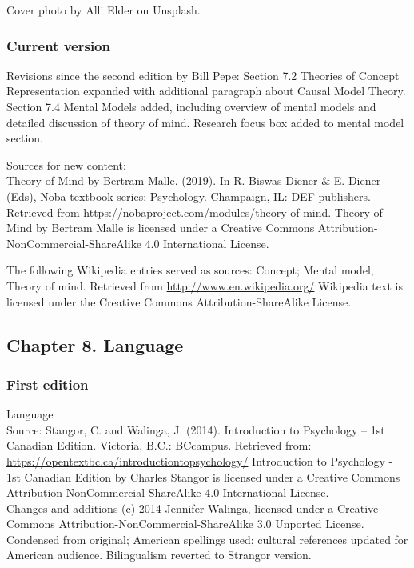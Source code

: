 \documentclass[
]{krantz}
\begin{document}
Cover photo by Alli Elder on Unsplash.

\subsubsection*{Current version}\label{current-version-2}


Revisions since the second edition by Bill Pepe: Section 7.2 Theories of Concept Representation expanded with additional paragraph about Causal Model Theory. Section 7.4 Mental Models added, including overview of mental models and detailed discussion of theory of mind. Research focus box added to mental model section.

Sources for new content:\\
Theory of Mind by Bertram Malle. (2019). In R. Biswas-Diener \& E. Diener (Eds), Noba textbook series: Psychology. Champaign, IL: DEF publishers. Retrieved from \url{https://nobaproject.com/modules/theory-of-mind}.
Theory of Mind by Bertram Malle is licensed under a Creative Commons Attribution-NonCommercial-ShareAlike 4.0 International License.

The following Wikipedia entries served as sources: Concept; Mental model; Theory of mind. Retrieved from \url{http://www.en.wikipedia.org/}
Wikipedia text is licensed under the Creative Commons Attribution-ShareAlike License.

\subsection*{Chapter 8. Language}\label{chapter-8.-language}


\subsubsection*{First edition}\label{first-edition-8}


Language\\
Source: Stangor, C. and Walinga, J. (2014). Introduction to Psychology -- 1st Canadian Edition. Victoria, B.C.: BCcampus. Retrieved from: \url{https://opentextbc.ca/introductiontopsychology/}
Introduction to Psychology - 1st Canadian Edition by Charles Stangor is licensed under a Creative Commons Attribution-NonCommercial-ShareAlike 4.0 International License.\\
Changes and additions (c) 2014 Jennifer Walinga, licensed under a Creative Commons Attribution-NonCommercial-ShareAlike 3.0 Unported License.\\
Condensed from original; American spellings used; cultural references updated for American audience. Bilingualism reverted to Strangor version.
\end{document}
